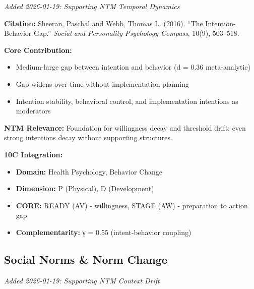 \textit{Added 2026-01-19: Supporting NTM Temporal Dynamics}

\begin{tcolorbox}[colback=yellow!5!white,colframe=yellow!75!black,title=Key Paper: Sheeran \& Webb (2016)]
\textbf{Citation:} Sheeran, Paschal and Webb, Thomas L. (2016). ``The Intention-Behavior Gap.'' \textit{Social and Personality Psychology Compass}, 10(9), 503--518.

\textbf{Core Contribution:}
\begin{itemize}[nosep]
    \item Medium-large gap between intention and behavior (d = 0.36 meta-analytic)
    \item Gap widens over time without implementation planning
    \item Intention stability, behavioral control, and implementation intentions as moderators
\end{itemize}

\textbf{NTM Relevance:} Foundation for willingness decay and threshold drift: even strong intentions decay without supporting structures.

\textbf{10C Integration:}
\begin{itemize}[nosep]
    \item \textbf{Domain:} Health Psychology, Behavior Change
    \item \textbf{Dimension:} P (Physical), D (Development)
    \item \textbf{CORE:} READY (AV) - willingness, STAGE (AW) - preparation to action gap
    \item \textbf{Complementarity:} γ = 0.55 (intent-behavior coupling)
\end{itemize}
\end{tcolorbox}

\subsection{Social Norms \& Norm Change}
\label{subsec:ot-norms}

\textit{Added 2026-01-19: Supporting NTM Context Drift}

